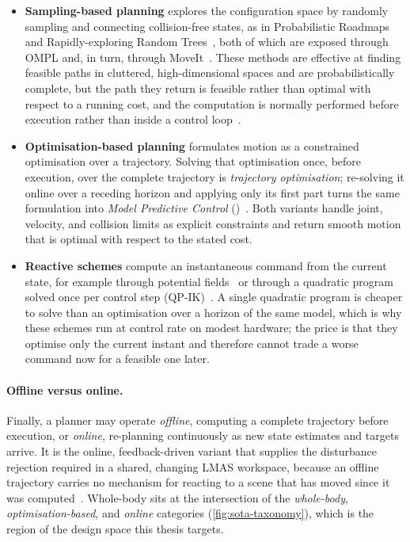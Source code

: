 \begin{itemize}
  \item \textbf{Sampling-based planning} explores the configuration
        space by randomly sampling and connecting collision-free states,
        as in Probabilistic Roadmaps~\cite{Kavraki1996PRM} and
        Rapidly-exploring Random Trees~\cite{LaValle2001RRT}, both of
        which are exposed through OMPL and, in turn, through
        MoveIt~\cite{Sucan2012OMPL,moveit2}. These methods are effective
        at finding feasible paths in cluttered, high-dimensional spaces
        and are probabilistically complete, but the path they return is
        feasible rather than optimal with respect to a running cost, and
        the computation is normally performed before execution rather
        than inside a control loop~\cite{LaValle2006Planning}.
  \item \textbf{Optimisation-based planning} formulates motion as a
        constrained optimisation over a trajectory. Solving that
        optimisation once, before execution, over the complete
        trajectory is \emph{trajectory optimisation}; re-solving it
        online over a receding horizon and applying only its first part
        turns the same formulation into \emph{Model Predictive Control}
        (\mpc{})~\cite{Rawlings2017MPC,Mayne2000Constrained}. Both
        variants handle joint, velocity, and collision limits as
        explicit constraints and return smooth motion that is optimal
        with respect to the stated cost.
  \item \textbf{Reactive schemes} compute an instantaneous command from
        the current state, for example through potential
        fields~\cite{Khatib1986PotentialFields} or through a quadratic
        program solved once per control step
        (QP-IK)~\cite{Haviland2021NEO}. A single quadratic program is
        cheaper to solve than an optimisation over a horizon of the same
        model, which is why these schemes run at control rate on modest
        hardware; the price is that they optimise only the current
        instant and therefore cannot trade a worse command now for a
        feasible one later.
\end{itemize}

\paragraph{Offline versus online.}
Finally, a planner may operate \emph{offline}, computing a complete
trajectory before execution, or \emph{online}, re-planning continuously
as new state estimates and targets arrive. It is the online,
feedback-driven variant that supplies the disturbance rejection required
in a shared, changing LMAS workspace, because an offline trajectory
carries no mechanism for reacting to a scene that has moved since it was
computed~\cite{Finean2023ContextAware}. Whole-body \mpc{} sits at the
intersection of the \emph{whole-body}, \emph{optimisation-based}, and
\emph{online} categories (\cref{fig:sota-taxonomy}), which is the region
of the design space this thesis targets.

